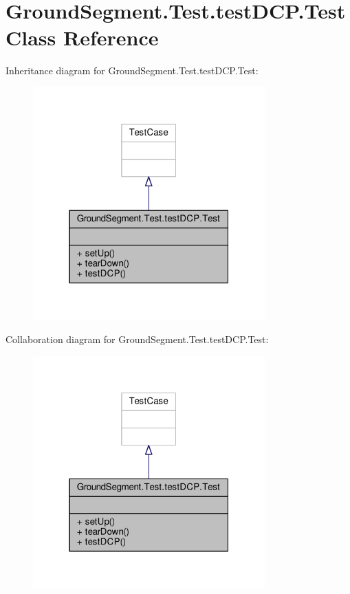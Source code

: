 \hypertarget{class_ground_segment_1_1_test_1_1test_d_c_p_1_1_test}{}\section{Ground\+Segment.\+Test.\+test\+D\+C\+P.\+Test Class Reference}
\label{class_ground_segment_1_1_test_1_1test_d_c_p_1_1_test}


Inheritance diagram for Ground\+Segment.\+Test.\+test\+D\+C\+P.\+Test\+:\nopagebreak
\begin{figure}[H]
\begin{center}
\leavevmode
\includegraphics[width=253pt]{class_ground_segment_1_1_test_1_1test_d_c_p_1_1_test__inherit__graph}
\end{center}
\end{figure}


Collaboration diagram for Ground\+Segment.\+Test.\+test\+D\+C\+P.\+Test\+:\nopagebreak
\begin{figure}[H]
\begin{center}
\leavevmode
\includegraphics[width=253pt]{class_ground_segment_1_1_test_1_1test_d_c_p_1_1_test__coll__graph}
\end{center}
\end{figure}
